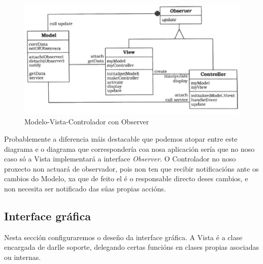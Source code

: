 \begin{figure}
\centering
\includegraphics[width=\textwidth,height=\textheight,keepaspectratio]{figuras/MVC-observer}
\caption{Modelo-Vista-Controlador con Observer}
\label{MVC-observer}
\end{figure}

Probablemente a diferencia máis destacable que podemos atopar entre este diagrama e o diagrama que correspondería coa nosa aplicación sería que no noso caso só a Vista implementará a interface \textit{Observer}. O Controlador no noso proxecto non actuará de observador, pois non ten que recibir notificacións ante os cambios do Modelo, xa que de feito el é o responsable directo deses cambios, e non necesita ser notificado das súas propias accións.

\subsection{Interface gráfica}

Nesta sección configuraremos o deseño da interface gráfica. A Vista é a clase encargada de darlle soporte, delegando certas funcións en clases propias asociadas ou internas.